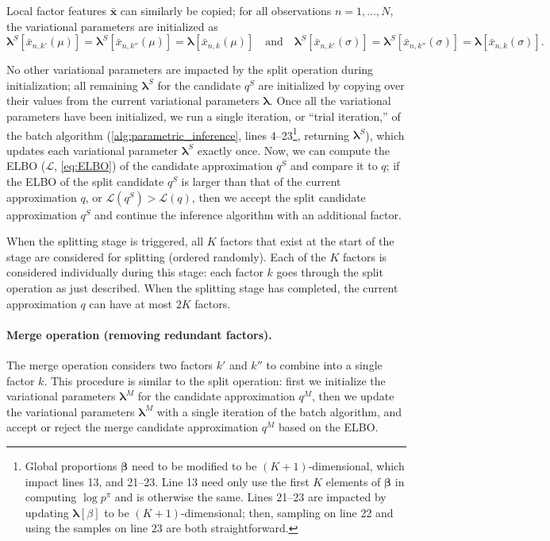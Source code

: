 \documentclass[twoside,11pt]{article}
\begin{document}
Local factor features $\boldsymbol{\bar{x}}$ can similarly be copied; for all observations $n=1,\dots,N$, the variational parameters are initialized as
\begin{equation}
    \boldsymbol{\lambda}^S[\bar{x}_{n,k'}(\mu)] = 
    \boldsymbol{\lambda}^S[\bar{x}_{n,k''}(\mu)] =  \boldsymbol{\lambda}[\bar{x}_{n,k}(\mu)]
    \quad \mbox{and} \quad
    \boldsymbol{\lambda}^S[\bar{x}_{n,k'}(\sigma)] = 
    \boldsymbol{\lambda}^S[\bar{x}_{n,k''}(\sigma)] =  \boldsymbol{\lambda}[\bar{x}_{n,k}(\sigma)].
    \label{eq:S5}
\end{equation}

No other variational parameters are impacted by the split operation during initialization; all remaining $\boldsymbol{\lambda}^S$ for the candidate $q^S$ are initialized by copying over their values from the current variational parameters $\boldsymbol{\lambda}$.
Once all the variational parameters have been initialized, we run a single iteration, or ``trial iteration,'' of the batch algorithm (\cref{alg:parametric_inference}, lines 4--23\footnote{\label{note:k_plus_1} Global proportions $\boldsymbol{\beta}$ need to be modified to be $(K+1)$-dimensional, which impact lines 13, and 21--23.  Line 13 need only use the first $K$ elements of $\boldsymbol{\beta}$ in computing $\log p^\pi$ and is otherwise the same.  Lines 21--23 are impacted by updating $\boldsymbol{\lambda}[\beta]$ to be $(K+1)$-dimensional; then, sampling on line 22 and using the samples on line 23 are both straightforward. }, returning $\boldsymbol{\lambda}^S$), which updates each variational parameter $\boldsymbol{\lambda}^S$ exactly once.  Now, we can compute the ELBO ($\mathcal{L}$, \cref{eq:ELBO}) of the candidate approximation $q^S$ and compare it to $q$; if the ELBO of the split candidate $q^S$ is larger than that of the current approximation $q$, or $\mathcal{L}(q^S) > \mathcal{L}(q)$, then we accept the split candidate approximation $q^S$ and continue the inference algorithm with an additional factor. 

When the splitting stage is triggered, all $K$ factors that exist at the start of the stage are considered for splitting (ordered randomly).  Each of the $K$ factors is considered individually during this stage: each factor $k$ goes through the split operation as just described.  When the splitting stage has completed, the current approximation $q$ can have at most $2K$ factors.

\paragraph{Merge operation (removing redundant factors).}
The merge operation considers two factors $k'$ and $k''$ to combine into a single factor $k$.  This procedure is similar to the split operation: first we initialize the variational parameters $\boldsymbol{\lambda}^M$ for the candidate approximation $q^M$, then we update the variational parameters $\boldsymbol{\lambda}^M$ with a single iteration of the batch algorithm, and accept or reject the merge candidate approximation $q^M$ based on the ELBO.
\end{document}
